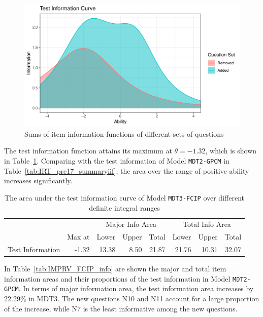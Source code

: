 \documentclass[a4paper]{report}
\begin{document}
\begin{figure}[H]
  \centering
  \includegraphics[width=\linewidth]{fig/IMPRV_FCIP_tifcf.pdf}
  \caption{\label{fig:IMPRV_FCIP_tifcf}Sums of item information functions of different sets of questions}
\end{figure}

The test information function attains its maximum at $\theta=-1.32$, which is shown in Table~\ref{tab:IMPRV_FCIP_summarytif}. Comparing with the test information of Model \texttt{MDT2-GPCM} in Table~\ref{tab:IRT_pre17_summaryiif}, the area over the range of positive ability increases significantly. 

\begin{table}[ht]
  \centering
  \begin{tabular}{rr|rrr|rrr}
    \hline
    & & \multicolumn{3}{c|}{Major Info Area} & \multicolumn{3}{c}{Total Info Area} \\
   & Max at & Lower & Upper & Total & Lower & Upper & Total \\ 
   \hline
   Test Information & -1.32 & 13.38 & 8.50 & 21.87 & 21.76 & 10.31 & 32.07 \\ 
      \hline
  \end{tabular}
  \caption{\label{tab:IMPRV_FCIP_summarytif}The area under the test information curve of Model \texttt{MDT3-FCIP} over different definite integral ranges}
\end{table}

In Table~\ref{tab:IMPRV_FCIP_info} are shown the major and total item information areas and their proportions of the test information in Model \texttt{MDT2-GPCM}. In terms of major information area, the test information area increases by 22.29\% in MDT3. The new questions N10 and N11 account for a large proportion of the increase, while N7 is the least informative among the new questions. 
\end{document}
